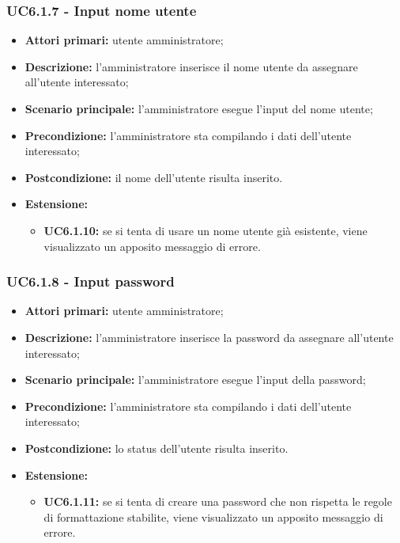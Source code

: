 \subsubsection{UC6.1.7 - Input nome utente}
	\begin{itemize}
		\item \textbf{Attori primari:} utente amministratore;
		\item \textbf{Descrizione:} l'amministratore inserisce il nome utente da assegnare all'utente interessato;
		\item \textbf{Scenario principale:} l'amministratore esegue l'input del nome utente;
		\item \textbf{Precondizione:} l'amministratore sta compilando i dati dell'utente interessato;
		\item \textbf{Postcondizione:} il nome dell'utente risulta inserito.
		\item \textbf{Estensione:}
		\begin{itemize}
			\item \textbf{UC6.1.10:} se si tenta di usare un nome utente già esistente, viene visualizzato un apposito messaggio di errore.
		\end{itemize}
	\end{itemize}

\subsubsection{UC6.1.8 - Input password}
	\begin{itemize}
		\item \textbf{Attori primari:} utente amministratore;
		\item \textbf{Descrizione:} l'amministratore inserisce la password da assegnare all'utente interessato;
		\item \textbf{Scenario principale:} l'amministratore esegue l'input della password;
		\item \textbf{Precondizione:} l'amministratore sta compilando i dati dell'utente interessato;
		\item \textbf{Postcondizione:} lo status dell'utente risulta inserito.
		\item \textbf{Estensione:}
		\begin{itemize}
			\item \textbf{UC6.1.11:} se si tenta di creare una password che non rispetta le regole di formattazione stabilite, viene visualizzato un apposito messaggio di errore.
		\end{itemize}
	\end{itemize}

